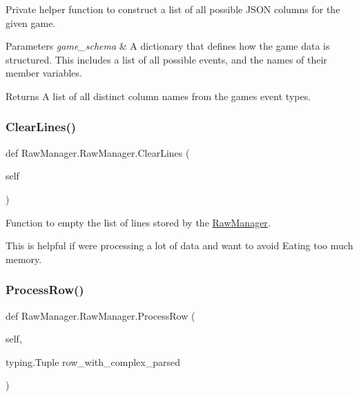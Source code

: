Private helper function to construct a list of all possible J\+S\+ON columns for the given game. 


\begin{DoxyParams}{Parameters}
{\em game\+\_\+schema} & A dictionary that defines how the game data is structured. This includes a list of all possible events, and the names of their member variables. \\
\hline
\end{DoxyParams}
\begin{DoxyReturn}{Returns}
A list of all distinct column names from the game\textquotesingle{}s event types. 
\end{DoxyReturn}
\mbox{\label{class_raw_manager_1_1_raw_manager_ab8a53bb1ce2f9004fba4648f3a0a6e11}} 
\subsubsection{\texorpdfstring{ClearLines()}{ClearLines()}}
{\footnotesize\ttfamily def Raw\+Manager.\+Raw\+Manager.\+Clear\+Lines (\begin{DoxyParamCaption}\item[{}]{self }\end{DoxyParamCaption})}



Function to empty the list of lines stored by the \mbox{\hyperlink{class_raw_manager_1_1_raw_manager}{Raw\+Manager}}. 

This is helpful if we\textquotesingle{}re processing a lot of data and want to avoid Eating too much memory. \mbox{\label{class_raw_manager_1_1_raw_manager_ac3f8a97ca8ffb14d53201adbd2e59b93}} 
\subsubsection{\texorpdfstring{ProcessRow()}{ProcessRow()}}
{\footnotesize\ttfamily def Raw\+Manager.\+Raw\+Manager.\+Process\+Row (\begin{DoxyParamCaption}\item[{}]{self,  }\item[{typing.\+Tuple}]{row\+\_\+with\+\_\+complex\+\_\+parsed }\end{DoxyParamCaption})}



